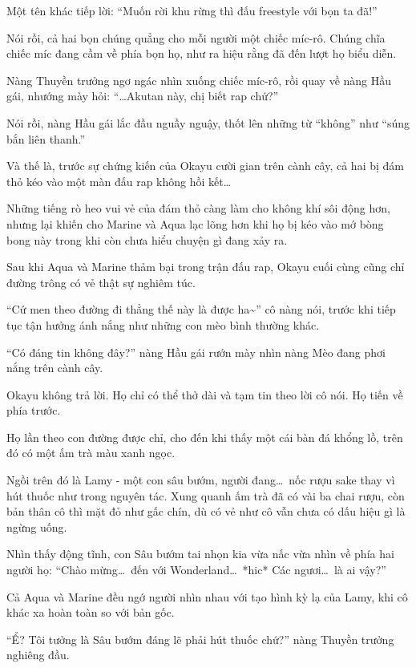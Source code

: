 \documentclass[../main.tex]{subfiles}
\begin{document}
Một tên khác tiếp lời: ``Muốn rời khu rừng thì đấu freestyle với bọn ta đã!''

Nói rồi, cả hai bọn chúng quẳng cho mỗi người một chiếc míc-rô. Chúng chĩa chiếc míc đang cầm về phía bọn họ, như ra hiệu rằng đã đến lượt họ biểu diễn.

Nàng Thuyền trưởng ngơ ngác nhìn xuống chiếc míc-rô, rồi quay về nàng Hầu gái, nhướng mày hỏi: ``\dots Akutan này, chị biết rap chứ?''

Nói rồi, nàng Hầu gái lắc đầu nguầy nguậy, thốt lên những từ ``không'' như ``súng bắn liên thanh.''

Và thế là, trước sự chứng kiến của Okayu cười gian trên cành cây, cả hai bị đám thỏ kéo vào một màn đấu rap không hồi kết\dots

Những tiếng rò heo vui vẻ của đám thỏ càng làm cho không khí sôi động hơn, nhưng lại khiến cho Marine và Aqua lạc lõng hơn khi họ bị kéo vào mớ bòng bong này trong khi còn chưa hiểu chuyện gì đang xảy ra.

\ct

Sau khi Aqua và Marine thảm bại trong trận đấu rap, Okayu cuối cùng cũng chỉ đường trông có vẻ thật sự nghiêm túc.

``Cứ men theo đường đi thẳng thế này là được ha\~{}'' cô nàng nói, trước khi tiếp tục tận hưởng ánh nắng như những con mèo bình thường khác.

``Có đáng tin không đây?'' nàng Hầu gái rướn mày nhìn nàng Mèo đang phơi nắng trên cành cây.

Okayu không trả lời. Họ chỉ có thể thở dài và tạm tin theo lời cô nói. Họ tiến về phía trước.

Họ lần theo con đường được chỉ, cho đến khi thấy một cái bàn đá khổng lồ, trên đó có một ấm trà màu xanh ngọc.

Ngồi trên đó là Lamy - một con sâu bướm, người đang\dots\ nốc rượu sake thay vì hút thuốc như trong nguyên tác.  Xung quanh ấm trà đã có vài ba chai rượu, còn bản thân cô thì mặt đỏ như gấc chín, dù có vẻ như cô vẫn chưa có dấu hiệu gì là ngừng uống.

Nhìn thấy động tĩnh, con Sâu bướm tai nhọn kia vừa nấc vừa nhìn về phía hai người họ: ``Chào mừng\dots\ đến với Wonderland\dots\ *hic* Các ngươi\dots\ là ai vậy?''

Cả Aqua và Marine đều ngớ người nhìn nhau với tạo hình kỳ lạ của Lamy, khi cô khác xa hoàn toàn so với bản gốc.

``Ể? Tôi tưởng là Sâu bướm đáng lẽ phải hút thuốc chứ?'' nàng Thuyền trưởng nghiêng đầu.
\end{document}
